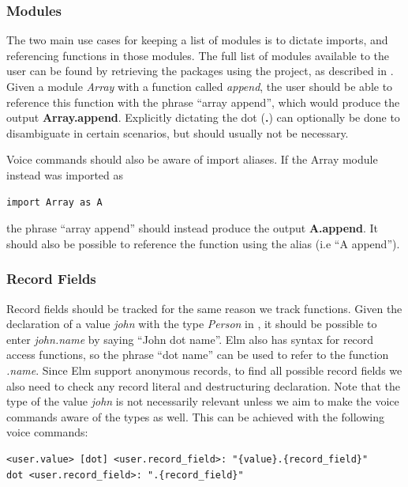 \documentclass[../thesis.tex]{subfiles}
\begin{document}
\subsubsection{Modules}%
\label{par:modules}
The two main use cases for keeping a list of modules is to dictate imports, and referencing functions in those modules.
The full list of modules available to the user can be found by retrieving the packages using the project, as described in .
Given a module \textit{Array} with a function called \textit{append}, the user should be able to
reference this function with the phrase ``array append'', which would produce the output \textbf{Array.append}.
Explicitly dictating the dot (\textbf{.}) can optionally be done to disambiguate in certain scenarios, but should usually not be necessary.

Voice commands should also be aware of import aliases.
If the Array module instead was imported as
\begin{verbatim}
import Array as A
\end{verbatim}
the phrase ``array append'' should instead produce the output \textbf{A.append}.
It should also be possible to reference the function using the alias (i.e ``A append'').

\subsubsection{Record Fields}
Record fields should be tracked for the same reason we track functions.
Given the declaration of a value \textit{john} with the type \textit{Person} in ,
it should be possible to enter \textit{john.name} by saying ``John dot name''.
Elm also has syntax for record access functions, so the phrase ``dot name'' can be used to
refer to the function \textit{.name}.
Since Elm support anonymous records, to find all possible record fields we also need to check
any record literal and destructuring declaration.
Note that the type of the value \textit{john} is not necessarily relevant unless we
aim to make the voice commands aware of the types as well. %
This can be achieved with the following voice commands:
\begin{verbatim}
<user.value> [dot] <user.record_field>: "{value}.{record_field}"
dot <user.record_field>: ".{record_field}"
\end{verbatim}
\end{document}
